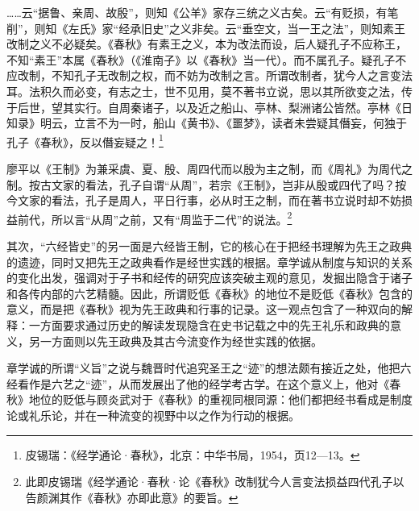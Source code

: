 \documentclass[a4paper, 12pt, openright]{ctexbook}
\renewenvironment{quote}
  {\list{}{\rightmargin2\ccwd \leftmargin2\ccwd \itemindent=2\ccwd \listparindent=2\ccwd}%
   \item\relax\small\kaishu\color{black}}
  {\endlist}
\begin{document}
\begin{quote}
……云“据鲁、亲周、故殷”，则知《公羊》家存三统之义古矣。云“有贬损，有笔削”，则知《左氏》家“经承旧史”之义非矣。云“垂空文，当一王之法”，则知素王改制之义不必疑矣。《春秋》有素王之义，本为改法而设，后人疑孔子不应称王，不知“素王”本属《春秋》（《淮南子》以《春秋》当一代）。而不属孔子。疑孔子不应改制，不知孔子无改制之权，而不妨为改制之言。所谓改制者，犹今人之言变法耳。法积久而必变，有志之士，世不见用，莫不著书立说，思以其所欲变之法，传于后世，望其实行。自周秦诸子，以及近之船山、亭林、梨洲诸公皆然。亭林《日知录》明云，立言不为一时，船山《黄书》、《噩梦》，读者未尝疑其僭妄，何独于孔子《春秋》，反以僭妄疑之！\footnote{皮锡瑞：《经学通论·春秋》，北京：中华书局，1954，页12—13。}
\end{quote}

廖平以《王制》为兼采虞、夏、殷、周四代而以殷为主之制，而《周礼》为周代之制。按古文家的看法，孔子自谓“从周”，若宗《王制》，岂非从殷或四代了吗？按今文家的看法，孔子是周人，平日行事，必从时王之制，而在著书立说时却不妨损益前代，所以言“从周”之前，又有“周监于二代”的说法。\footnote{此即皮锡瑞《经学通论·春秋·论《春秋》改制犹今人言变法损益四代孔子以告颜渊其作《春秋》亦即此意》的要旨。}

其次，“六经皆史”的另一面是六经皆王制，它的核心在于把经书理解为先王之政典的遗迹，同时又把先王之政典看作是经世实践的根据。章学诚从制度与知识的关系的变化出发，强调对于子书和经传的研究应该突破主观的意见，发掘出隐含于诸子和各传内部的六艺精髓。因此，所谓贬低《春秋》的地位不是贬低《春秋》包含的意义，而是把《春秋》视为先王政典和行事的记录。这一观点包含了一种双向的解释：一方面要求通过历史的解读发现隐含在史书记载之中的先王礼乐和政典的意义，另一方面则以先王政典及其古今流变作为经世实践的依据。

章学诚的所谓“义旨”之说与魏晋时代追究圣王之“迹”的想法颇有接近之处，他把六经看作是六艺之“迹”，从而发展出了他的经学考古学。在这个意义上，他对《春秋》地位的贬低与顾炎武对于《春秋》的重视同根同源：他们都把经书看成是制度论或礼乐论，并在一种流变的视野中以之作为行动的根据。
\end{document}
